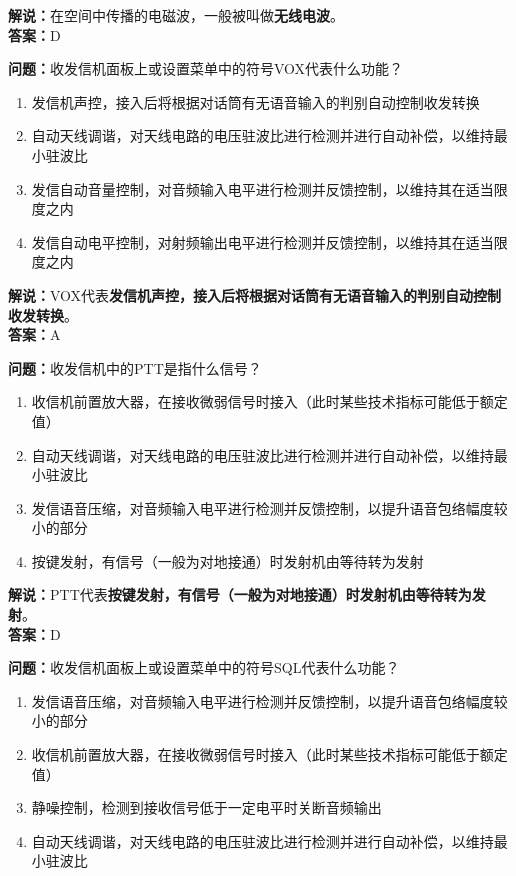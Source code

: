 \textbf{解说：}在空间中传播的电磁波，一般被叫做\textbf{无线电波}。\\\textbf{答案：}D



\textbf{问题：}收发信机面板上或设置菜单中的符号VOX代表什么功能？

\begin{enumerate}[label=\Alph*), leftmargin=1.5cm]
	\item 发信机声控，接入后将根据对话筒有无语音输入的判别自动控制收发转换
	\item 自动天线调谐，对天线电路的电压驻波比进行检测并进行自动补偿，以维持最小驻波比
	\item 发信自动音量控制，对音频输入电平进行检测并反馈控制，以维持其在适当限度之内
	\item 发信自动电平控制，对射频输出电平进行检测并反馈控制，以维持其在适当限度之内
\end{enumerate}

\textbf{解说：}VOX代表\textbf{发信机声控，接入后将根据对话筒有无语音输入的判别自动控制收发转换}。\\\textbf{答案：}A



\textbf{问题：}收发信机中的PTT是指什么信号？

\begin{enumerate}[label=\Alph*), leftmargin=1.5cm]
	\item 收信机前置放大器，在接收微弱信号时接入（此时某些技术指标可能低于额定值）
	\item 自动天线调谐，对天线电路的电压驻波比进行检测并进行自动补偿，以维持最小驻波比
	\item 发信语音压缩，对音频输入电平进行检测并反馈控制，以提升语音包络幅度较小的部分
	\item 按键发射，有信号（一般为对地接通）时发射机由等待转为发射
\end{enumerate}

\textbf{解说：}PTT代表\textbf{按键发射，有信号（一般为对地接通）时发射机由等待转为发射}。\\\textbf{答案：}D



\textbf{问题：}收发信机面板上或设置菜单中的符号SQL代表什么功能？

\begin{enumerate}[label=\Alph*), leftmargin=1.5cm]
	\item 发信语音压缩，对音频输入电平进行检测并反馈控制，以提升语音包络幅度较小的部分
	\item 收信机前置放大器，在接收微弱信号时接入（此时某些技术指标可能低于额定值）
	\item 静噪控制，检测到接收信号低于一定电平时关断音频输出
	\item 自动天线调谐，对天线电路的电压驻波比进行检测并进行自动补偿，以维持最小驻波比
\end{enumerate}

